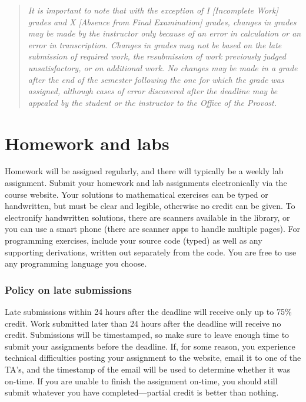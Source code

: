 \documentclass[12pt]{article}
\begin{document}
\begin{quote}\it \small
It is important to note that with the exception of I [Incomplete Work] grades and X [Absence from Final Examination] grades, changes in grades may be made by the instructor only because of an error in calculation or an error in transcription. Changes in grades may not be based on the late submission of required work, the resubmission of work previously judged unsatisfactory, or on additional 
work. No changes may be made in a grade after the end of the semester following the one for which the grade was 
assigned, although cases of error discovered after the deadline may be appealed by the student or the instructor to 
the Office of the Provost. 
\end{quote}


\section{Homework and labs}

Homework will be assigned regularly, and there will typically be a weekly lab assignment. 
Submit your homework and lab assignments electronically via the course website. Your solutions to mathematical exercises can be typed or handwritten, but must be clear and legible, otherwise no credit can be given. To electronify handwritten solutions, there are scanners available in the library, or you can use a smart phone (there are scanner apps to handle multiple pages). For programming exercises, include your source code (typed) as well as any supporting derivations, written out separately from the code. You are free to use any programming language you choose.


\subsubsection*{Policy on late submissions}

Late submissions within 24 hours after the deadline will receive only up to 75\% credit.  Work submitted later than 24 hours after the deadline will receive no credit.  Submissions will be timestamped, so make sure to leave enough time to submit your assignments before the deadline. If, for some reason, you experience technical difficulties posting your assignment to the website, email it to one of the TA's, and the timestamp of the email will be used to determine whether it was on-time. If you are unable to finish the assignment on-time, you should still submit whatever you have completed---partial credit is better than nothing.
\end{document}
